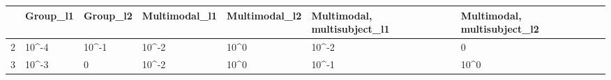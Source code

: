 \begin{tabular}{lllllll}
\toprule
 & Group_l1 & Group_l2 & Multimodal_l1 & Multimodal_l2 & Multimodal, multisubject_l1 & Multimodal, multisubject_l2 \\
\midrule
2 & 10^-4 & 10^-1 & 10^-2 & 10^0 & 10^-2 & 0 \\
3 & 10^-3 & 0 & 10^-2 & 10^0 & 10^-1 & 10^0 \\
\bottomrule
\end{tabular}

